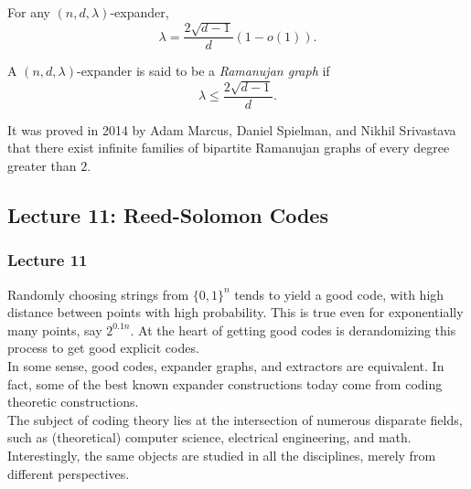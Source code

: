 			\begin{ftheo}
				For any $(n,d,\lambda)$-expander,
				\[ \lambda = \frac{2\sqrt{d-1}}{d}(1 - o(1)). \]
			\end{ftheo}

			\begin{fdef}
				A $(n,d,\lambda)$-expander is said to be a \emph{Ramanujan graph} if
				\[ \lambda \le \frac{2\sqrt{d-1}}{d}. \]
			\end{fdef}

			It was proved in 2014 by Adam Marcus, Daniel Spielman, and Nikhil Srivastava that there exist infinite families of bipartite Ramanujan graphs of every degree greater than $2$.

	\subsection{Lecture 11: Reed-Solomon Codes}

		\subsubsection{Lecture 11}

			Randomly choosing strings from $\{0,1\}^n$ tends to yield a good code, with high distance between points with high probability. This is true even for exponentially many points, say $2^{0.1n}$. At the heart of getting good codes is derandomizing this process to get good explicit codes.\\
			In some sense, good codes, expander graphs, and extractors are equivalent. In fact, some of the best known expander constructions today come from coding theoretic constructions.\\
			The subject of coding theory lies at the intersection of numerous disparate fields, such as (theoretical) computer science, electrical engineering, and math. Interestingly, the same objects are studied in all the disciplines, merely from different perspectives.\\

